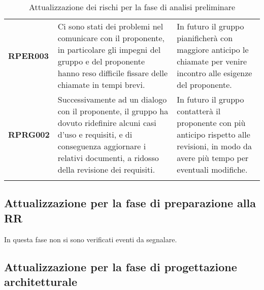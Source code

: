 \documentclass[../piano-di-progetto]{subfiles}
\begin{document}
\begin{longtable}[H]{|p{10em}|p{17em}|p{17em}|}
  \textbf{RPER003}                                    & Ci sono stati dei problemi nel comunicare con il proponente, in particolare gli impegni del gruppo e del proponente hanno reso difficile fissare delle chiamate in tempi brevi.                               & In futuro il gruppo pianificherà con maggiore anticipo le chiamate per venire incontro alle esigenze del proponente.                                                            \\
  \textbf{RPRG002}                                    & Successivamente ad un dialogo con il proponente, il gruppo ha dovuto ridefinire alcuni casi d'uso e requisiti, e di conseguenza aggiornare i relativi documenti, a ridosso della revisione dei requisiti.     & In futuro il gruppo contatterà il proponente con più anticipo rispetto alle revisioni, in modo da avere più tempo per eventuali modifiche.                                      \\
  \rowcolor{white}
  \caption{Attualizzazione dei rischi per la fase di analisi preliminare}%
  \label{tab:attualizzazione_fase_analisi_preliminare}
\end{longtable}


\subsection{Attualizzazione per la fase di preparazione alla RR}%
\label{sub:attualizzazione_fase_prep_RR}
In questa fase non si sono verificati eventi da segnalare.

\subsection{Attualizzazione per la fase di progettazione architetturale}%
\label{sub:attualizzazione_per_la_fase_di_progettazione_architetturale}
\end{document}
